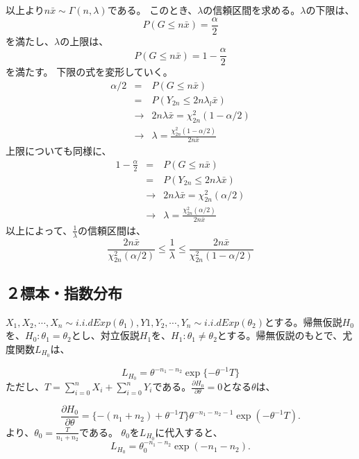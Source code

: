 以上より$n\bar{x}\sim \Gamma(n,\lambda)$である。
このとき、$\lambda$の信頼区間を求める。$\lambda$の下限は、
\begin{equation}
    P(G\leq n\bar{x}) = \frac{\alpha}{2}
\end{equation}
を満たし、$\lambda$の上限は、
\begin{equation}
P(G\leq n\bar{x}) = 1-\frac{\alpha}{2}
\end{equation}
を満たす。
下限の式を変形していく。
\begin{eqnarray*}
    \alpha/2 &=& P(G\leq n\bar{x})  \\
    &=& P(Y_{2n}\leq 2n \lambda_l \bar{x})\\
    &\rightarrow& 2n\lambda \bar{x} = \chi^2_{2n}(1-\alpha/2)\\
    &\rightarrow& \lambda = \frac{\chi^2_{2n}(1-\alpha/2)}{2n\bar{x}}
\end{eqnarray*}
上限についても同様に、
\begin{eqnarray*}
    1-\frac{\alpha}{2} &= & P(G\leq n\bar{x}) \\
    &=& P(Y_{2n}\leq 2n\lambda \bar{x})  \\
    &\rightarrow& 2n\lambda \bar{x} = \chi^2_{2n}(\alpha/2)\\
    &\rightarrow&  \lambda = \frac{\chi^2_{2n}(\alpha/2)}{2n\bar{x}}
\end{eqnarray*}
以上によって、$\frac{1}{\lambda}$の信頼区間は、
\begin{equation}
    \label{exp_model_confidence_interval}
    \frac{2n\bar{x}}{\chi^2_{2n}(\alpha/2)} \leq \frac{1}{\lambda} \leq \frac{2n\bar{x}}{\chi^2_{2n}(1-\alpha/2)}
\end{equation}



\subsection{２標本・指数分布}
$X_1,X_2,\cdots,X_n \sim i.i.d Exp(\theta_1),Y1,Y_2,\cdots,Y_n \sim i.i.d Exp(\theta_2)$とする。帰無仮説$H_0$を、$H_0:\theta_1=\theta_2$とし、対立仮説$H_1$を、$H_1 : \theta_1 \neq \theta_2$とする。帰無仮説のもとで、尤度関数$L_{H_0}$は、

\begin{equation}
    L_{H_0} = \theta^{-n_1-n_2}\exp\{-\theta^{-1}T\}
\end{equation}
ただし、$T=\sum_{i=0}^n X_i+\sum_{i=0}^n Y_i$である。$\frac{\partial H_0}{\partial\theta}=0$となる$\theta$は、

\begin{equation}
    \frac{\partial H_0}{\partial\theta} = \{ -(n_1+n_2)+\theta^{-1}T \}\theta^{-n_1-n_2-1}\exp(-\theta^{-1}T).
\end{equation}
より、$\theta_0=\frac{T}{n_1+n_2}$である。
$\theta_0$を$L_{H_0}$に代入すると、
\begin{equation}
    L_{H_0} = \theta_0^{-n_1-n_2}\exp(-n_1-n_2).
\end{equation}

